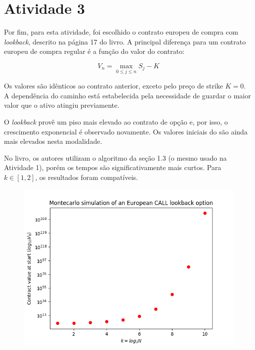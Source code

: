 \documentclass{article}
\begin{document}
\section*{Atividade 3}

Por fim, para esta atividade, foi escolhido o contrato europeu de compra com \emph{lookback}, descrito na página 17 do livro.
A principal diferença para um contrato europeu de compra regular é a função do valor do contrato:

\begin{equation}
	V_{n} = \max_{0 \leq j \leq n} S_{j}  -  K
\end{equation}

Os valores são idênticos ao contrato anterior, exceto pelo preço de strike $K = 0$.
A dependência do caminho está estabelecida pela necessidade de guardar o maior valor que o ativo atingiu previamente.

O \emph{lookback} provê um piso mais elevado ao contrato de opção e, por isso, o crescimento exponencial é observado novamente.
Os valores iniciais do são ainda mais elevados nesta modalidade.

No livro, os autores utilizam o algoritmo da seção 1.3 (o mesmo usado na Atividade 1), porém os tempos são significativamente mais curtos. Para $k \in [1, 2]$, os resultados foram compatíveis. 

\begin{figure}[H]
	\includegraphics[width=\linewidth]{Figure_5.png}
	\centering
	
	\label{}
\end{figure}
\end{document}
